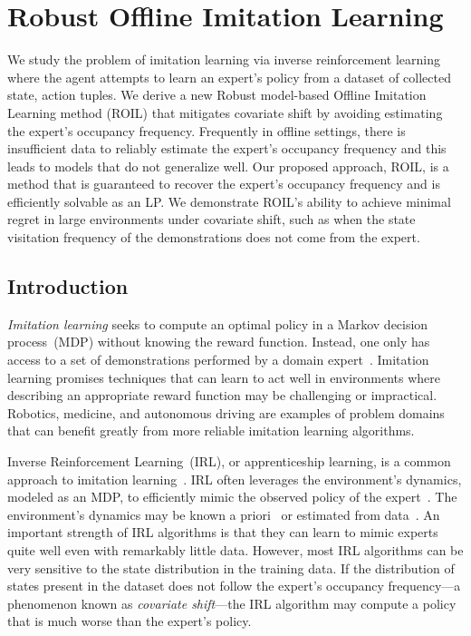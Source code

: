 \chapter{Robust Offline Imitation Learning}\label{ch:roil}

We study the problem of imitation learning via inverse reinforcement learning where the agent attempts to learn an expert's policy from a dataset of collected state, action tuples. We derive a new Robust model-based Offline Imitation Learning method (ROIL) that mitigates covariate shift by avoiding estimating the expert's occupancy frequency. Frequently in offline settings, there is insufficient data to reliably estimate the expert's occupancy frequency and this leads to models that do not generalize well. Our proposed approach, ROIL, is a method that is guaranteed to recover the expert's occupancy frequency and is efficiently solvable as an LP. We demonstrate ROIL's ability to achieve minimal regret in large environments under covariate shift, such as when the state visitation frequency of the demonstrations does not come from the expert.

\section{Introduction}

\emph{Imitation learning} seeks to compute an optimal policy in a Markov decision process~(MDP) without knowing the reward function. Instead, one only has access to a set of demonstrations performed by a domain expert~\cite{chang2021mitigating, Panaganti2023, Spencer2021, Rashidinejad2022}. Imitation learning promises techniques that can learn to act well in environments where describing an appropriate reward function may be challenging or impractical. Robotics, medicine, and autonomous driving are examples of problem domains that can benefit greatly from more reliable imitation learning algorithms. 

Inverse Reinforcement Learning~(IRL), or apprenticeship learning, is a common approach to imitation learning~\cite{abbeel2004, ziebart2008maximum,fu2018learning}. IRL often leverages the environment's dynamics, modeled as an MDP, to efficiently mimic the observed policy of the expert~\cite{arora2021survey}. The environment's dynamics may be known a priori~\cite{Syed2008, lacotte2019} or estimated from data~\cite{finn2016guided,Ho2016,chang2021mitigating}. An important strength of IRL algorithms is that they can learn to mimic experts quite well even with remarkably little data. However, most IRL algorithms can be very sensitive to the state distribution in the training data. If the distribution of states present in the dataset does not follow the expert's occupancy frequency---a phenomenon known as \emph{covariate shift}---the IRL algorithm may compute a policy that is much worse than the expert's policy. 

